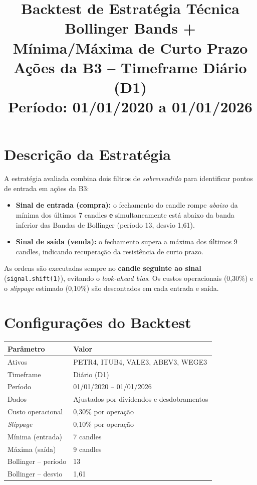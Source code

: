 \documentclass[12pt, a4paper]{article}
\title{
  \vspace{-1cm}
  {\Large \textbf{Backtest de Estratégia Técnica}} \\[0.4cm]
  {\large Bollinger Bands + Mínima/Máxima de Curto Prazo} \\[0.3cm]
  {\normalsize Ações da B3 -- Timeframe Diário (D1)} \\[0.2cm]
  {\small Período: 01/01/2020 a 01/01/2026}
}
\author{}
\date{}
\begin{document}
\maketitle
\thispagestyle{fancy}

\section{Descrição da Estratégia}

A estratégia avaliada combina dois filtros de \textit{sobrevendido} para identificar pontos de entrada em ações da B3:

\begin{itemize}
  \item \textbf{Sinal de entrada (compra):} o fechamento do candle rompe \textit{abaixo} da mínima dos últimos 7 candles \textbf{e} simultaneamente está abaixo da banda inferior das Bandas de Bollinger (período 13, desvio 1,61).
  \item \textbf{Sinal de saída (venda):} o fechamento supera a máxima dos últimos 9 candles, indicando recuperação da resistência de curto prazo.
\end{itemize}

\noindent As ordens são executadas sempre no \textbf{candle seguinte ao sinal} (\texttt{signal.shift(1)}), evitando o \textit{look-ahead bias}. Os custos operacionais (0,30\%) e o \textit{slippage} estimado (0,10\%) são descontados em cada entrada e saída.

\section{Configurações do Backtest}

\begin{center}
\begin{tabular}{ll}
  \toprule
  \textbf{Parâmetro} & \textbf{Valor} \\
  \midrule
  Ativos & PETR4, ITUB4, VALE3, ABEV3, WEGE3 \\
  Timeframe & Diário (D1) \\
  Período & 01/01/2020 -- 01/01/2026 \\
  Dados & Ajustados por dividendos e desdobramentos \\
  Custo operacional & 0,30\% por operação \\
  \textit{Slippage} & 0,10\% por operação \\
  Mínima (entrada) & 7 candles \\
  Máxima (saída) & 9 candles \\
  Bollinger -- período & 13 \\
  Bollinger -- desvio & 1,61 \\
  \bottomrule
\end{tabular}
\end{center}
\end{document}
